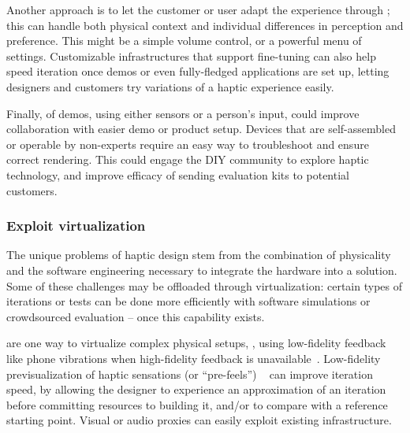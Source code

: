     Another approach is to let the customer or user adapt the experience through ; this can handle  both physical context and individual differences in perception and preference.
    This might be a simple volume control, or a powerful menu of settings.
    Customizable infrastructures that support fine-tuning can also help speed iteration once demos or even fully-fledged applications are set up, letting designers and customers try variations of a haptic experience easily.

    Finally,  of demos, using either sensors or a person's input, could improve collaboration with easier demo or product setup.
    Devices that are self-assembled or operable by non-experts require an easy way to troubleshoot and ensure correct rendering. 
    This could engage the DIY community to explore haptic technology, and improve efficacy of sending evaluation kits to potential customers.


\subsubsection{Exploit virtualization}
\noindent
    The unique problems of haptic design stem from the combination of %
    physicality and the software engineering %
    necessary to integrate the hardware into a solution.
    Some of these challenges may be offloaded through virtualization:
    certain types of iterations or tests can be done more efficiently with software simulations or crowdsourced evaluation -- once this capability exists.

     are one way to virtualize complex physical setups,
    \eg, using low-fidelity feedback like phone vibrations when high-fidelity feedback is unavailable~\citep{Schneider2016hapturk}.
    Low-fidelity previsualization of haptic sensations (or ``pre-feels'') ~\citep{Schneider2015} can improve iteration speed, by allowing the designer to experience an approximation of  an iteration before committing resources to building it, and/or to compare with a reference starting point.
    Visual or audio proxies can easily exploit existing infrastructure.
    
